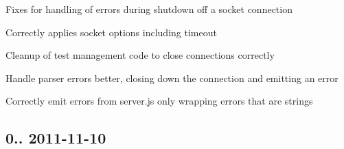 \begin{DoxyItemize}
\begin{DoxyItemize}
\end{DoxyItemize}
\item Fixes for handling of errors during shutdown off a socket connection
\item Correctly applies socket options including timeout
\item Cleanup of test management code to close connections correctly
\item Handle parser errors better, closing down the connection and emitting an error
\item Correctly emit errors from server.\+js only wrapping errors that are strings
\end{DoxyItemize}

\subsection*{0.. 2011-\/11-\/10 }


